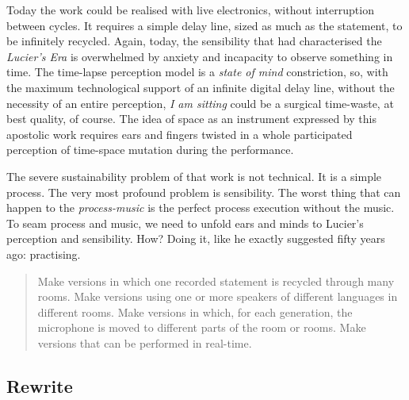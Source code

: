 Today the work could be realised with live electronics, without interruption between cycles. It requires a simple delay line, sized as much as the statement, to be infinitely recycled. Again, today, the sensibility that had characterised the \emph{Lucier's Era} is overwhelmed by anxiety and incapacity to observe something in time. The time-lapse perception model is a \emph{state of mind} constriction, so, with the maximum technological support of an infinite digital delay line, without the necessity of an entire perception, \emph{I am sitting} could be a surgical time-waste, at best quality, of course. The idea of space as an instrument expressed by this apostolic work requires ears and fingers twisted in a whole participated perception of time-space mutation during the performance.

The severe sustainability problem of that work is not technical. It is a simple process. The very most profound problem is sensibility. The worst thing that can happen to the \emph{process-music} is the perfect process execution without the music. To seam process and music, we need to unfold ears and minds to Lucier's perception and sensibility. How? Doing it, like he exactly suggested fifty years ago: practising.

\begin{quote}
Make versions in which one recorded statement is recycled through many rooms.
Make versions using one or more speakers of different languages in different
rooms. Make versions in which, for each generation, the microphone is moved to
different parts of the room or rooms. Make versions that can be performed in
real-time. \cite{lais69}
\end{quote}



\subsection*{Rewrite}


